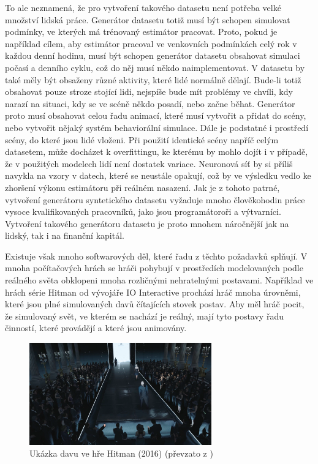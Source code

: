 To ale neznamená, že pro vytvoření takového datasetu není potřeba velké množství lidská práce.
Generátor datasetu totiž musí být schopen simulovat podmínky, ve kterých má trénovaný estimátor pracovat.
Proto, pokud je například cílem, aby estimátor pracoval ve venkovních podmínkách celý rok v každou denní hodinu, musí být schopen generátor datasetu obsahovat simulaci počasí a denního cyklu, což do něj musí někdo naimplementovat.
V datasetu by také měly být obsaženy různé aktivity, které lidé normálně dělají.
Bude-li totiž obsahovat pouze stroze stojící lidi, nejspíše bude mít problémy ve chvíli, kdy narazí na situaci, kdy se ve scéně někdo posadí, nebo začne běhat.
Generátor proto musí obsahovat celou řadu animací, které musí vytvořit a přidat do scény, nebo vytvořit nějaký systém behaviorální simulace.
Dále je podstatné i prostředí scény, do které jsou lidé vloženi.
Při použití identické scény napříč celým datasetem, může docházet k overfittingu, ke kterému by mohlo dojít i v případě, že v použitých modelech lidí není dostatek variace.
Neuronová síť by si příliš navykla na vzory v datech, které se neustále opakují, což by ve výsledku vedlo ke zhoršení výkonu estimátoru při reálném nasazení.
Jak je z tohoto patrné, vytvoření generátoru syntetického datasetu vyžaduje mnoho člověkohodin práce vysoce kvalifikovaných pracovníků, jako jsou programátoroři a výtvarníci.
Vytvoření takového generátoru datasetu je proto mnohem náročnější jak na lidský, tak i na finanční kapitál.

Existuje však mnoho softwarových děl, které řadu z těchto požadavků splňují.
V mnoha počítačových hrách se hráči pohybují v prostředích modelovaných podle reálného světa obklopeni mnoha rozličnými nehratelnými postavami.
Například ve hrách série Hitman \cite{hitman} od vývojáře IO Interactive prochází hráč mnoha úrovněmi, které jsou plné simulovaných davů čítajících stovek postav.
Aby měl hráč pocit, že simulovaný svět, ve kterém se nachází je reálný, mají tyto postavy řadu činností, které provádějí a které jsou animovány.

\begin{figure}[h!]
	\centering
	\includegraphics[width=0.7\textwidth]{Figures/datasets/GCC/Hitman_crowd.png}
	\caption{Ukázka davu ve hře Hitman (2016) (převzato z \cite{ign_2017})}
	\label{fig:Hitman}
\end{figure}


